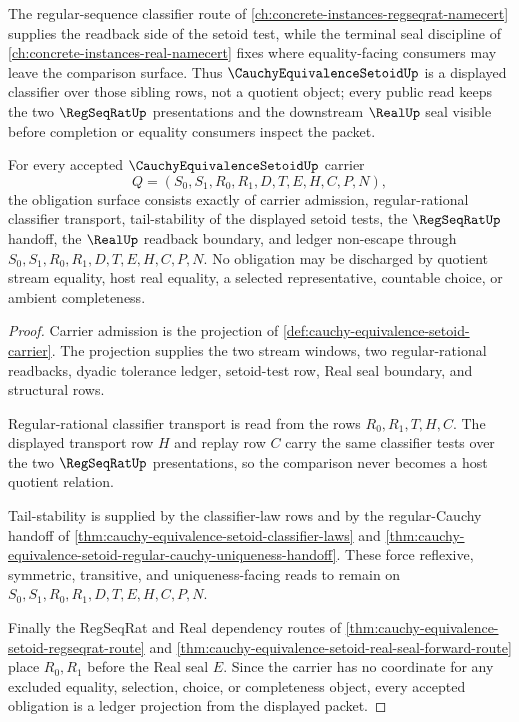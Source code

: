 The regular-sequence classifier route of \autoref{ch:concrete-instances-regseqrat-namecert} supplies the readback side of the setoid test, while the terminal seal discipline of \autoref{ch:concrete-instances-real-namecert} fixes where equality-facing consumers may leave the comparison surface. Thus $\CauchyEquivalenceSetoidUp$ is a displayed classifier over those sibling rows, not a quotient object; every public read keeps the two $\RegSeqRatUp$ presentations and the downstream $\RealUp$ seal visible before completion or equality consumers inspect the packet.

\begin{theorem}
\label{thm:cauchy-equivalence-setoid-obligation-surface}
For every accepted $\CauchyEquivalenceSetoidUp$ carrier
$$
Q=(S_0,S_1,R_0,R_1,D,T,E,H,C,P,N),
$$
the obligation surface consists exactly of carrier admission, regular-rational classifier transport, tail-stability of the displayed setoid tests, the $\RegSeqRatUp$ handoff, the $\RealUp$ readback boundary, and ledger non-escape through $S_0,S_1,R_0,R_1,D,T,E,H,C,P,N$. No obligation may be discharged by quotient stream equality, host real equality, a selected representative, countable choice, or ambient completeness.
\end{theorem}
\begin{proof}
Carrier admission is the projection of \autoref{def:cauchy-equivalence-setoid-carrier}. The projection supplies the two stream windows, two regular-rational readbacks, dyadic tolerance ledger, setoid-test row, Real seal boundary, and structural rows.

Regular-rational classifier transport is read from the rows $R_0,R_1,T,H,C$. The displayed transport row $H$ and replay row $C$ carry the same classifier tests over the two $\RegSeqRatUp$ presentations, so the comparison never becomes a host quotient relation.

Tail-stability is supplied by the classifier-law rows and by the regular-Cauchy handoff of \autoref{thm:cauchy-equivalence-setoid-classifier-laws} and \autoref{thm:cauchy-equivalence-setoid-regular-cauchy-uniqueness-handoff}. These force reflexive, symmetric, transitive, and uniqueness-facing reads to remain on $S_0,S_1,R_0,R_1,D,T,E,H,C,P,N$.

Finally the RegSeqRat and Real dependency routes of \autoref{thm:cauchy-equivalence-setoid-regseqrat-route} and \autoref{thm:cauchy-equivalence-setoid-real-seal-forward-route} place $R_0,R_1$ before the Real seal $E$. Since the carrier has no coordinate for any excluded equality, selection, choice, or completeness object, every accepted obligation is a ledger projection from the displayed packet.
\end{proof}

